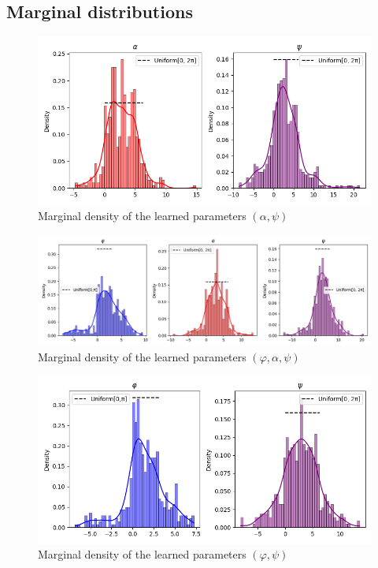 \documentclass[a4paper,12pt]{article}
\theoremstyle{definition}
\begin{document}
\subsection{Marginal distributions}

\begin{figure}[H]
    \centering
    \includegraphics[height=0.35\textwidth]{VariableSelectionPsi/alpha_psi.png}
    \caption{Marginal density of the learned parameters \((\alpha,\psi)\)}
    \label{fig:Distributions5.1}
\end{figure}
\begin{figure}[H]
    \centering
    \includegraphics[height=0.35\textwidth]{VariableSelectionPsi/phi_alpha_psi.png}
    \caption{Marginal density of the learned parameters \((\varphi,\alpha,\psi)\)}
    \label{fig:Distributions5.2}
\end{figure}
\begin{figure}[H]
    \centering
    \includegraphics[height=0.35\textwidth]{VariableSelectionPsi/phi_psi.png}
    \caption{Marginal density of the learned parameters \((\varphi,\psi)\)}
    \label{fig:Distributions5.3}
\end{figure}
\end{document}
